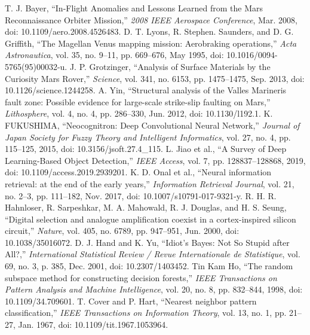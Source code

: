 \documentclass[conference]{IEEEtran}
\begin{document}
\begin{thebibliography}{00}
 T. J. Bayer, “In-Flight Anomalies and Lessons Learned from the Mars Reconnaissance Orbiter Mission,” \textit{2008 IEEE Aerospace Conference}, Mar. 2008, doi: 10.1109/aero.2008.4526483.
 D. T. Lyons, R. Stephen. Saunders, and D. G. Griffith, “The Magellan Venus mapping mission: Aerobraking operations,” \textit{Acta Astronautica}, vol. 35, no. 9–11, pp. 669–676, May 1995, doi: 10.1016/0094-5765(95)00032-u.
 J. P. Grotzinger, “Analysis of Surface Materials by the Curiosity Mars Rover,” \textit{Science}, vol. 341, no. 6153, pp. 1475–1475, Sep. 2013, doi: 10.1126/science.1244258.
 A. Yin, “Structural analysis of the Valles Marineris fault zone: Possible evidence for large-scale strike-slip faulting on Mars,” \textit{Lithosphere}, vol. 4, no. 4, pp. 286–330, Jun. 2012, doi: 10.1130/l192.1.
 K. FUKUSHIMA, “Neocognitron: Deep Convolutional Neural Network,” \textit{Journal of Japan Society for Fuzzy Theory and Intelligent Informatics}, vol. 27, no. 4, pp. 115–125, 2015, doi: 10.3156/jsoft.27.4\_115.
 L. Jiao et al., “A Survey of Deep Learning-Based Object Detection,” \textit{IEEE Access}, vol. 7, pp. 128837–128868, 2019, doi: 10.1109/access.2019.2939201.
 K. D. Onal et al., “Neural information retrieval: at the end of the early years,” \textit{Information Retrieval Journal}, vol. 21, no. 2–3, pp. 111–182, Nov. 2017, doi: 10.1007/s10791-017-9321-y.
 R. H. R. Hahnloser, R. Sarpeshkar, M. A. Mahowald, R. J. Douglas, and H. S. Seung, “Digital selection and analogue amplification coexist in a cortex-inspired silicon circuit,” \textit{Nature}, vol. 405, no. 6789, pp. 947–951, Jun. 2000, doi: 10.1038/35016072.
 D. J. Hand and K. Yu, “Idiot’s Bayes: Not So Stupid after All?,” \textit{International Statistical Review / Revue Internationale de Statistique}, vol. 69, no. 3, p. 385, Dec. 2001, doi: 10.2307/1403452.
 Tin Kam Ho, “The random subspace method for constructing decision forests,” \textit{IEEE Transactions on Pattern Analysis and Machine Intelligence}, vol. 20, no. 8, pp. 832–844, 1998, doi: 10.1109/34.709601.
 T. Cover and P. Hart, “Nearest neighbor pattern classification,” \textit{IEEE Transactions on Information Theory}, vol. 13, no. 1, pp. 21–27, Jan. 1967, doi: 10.1109/tit.1967.1053964.
\end{thebibliography}
\end{document}

